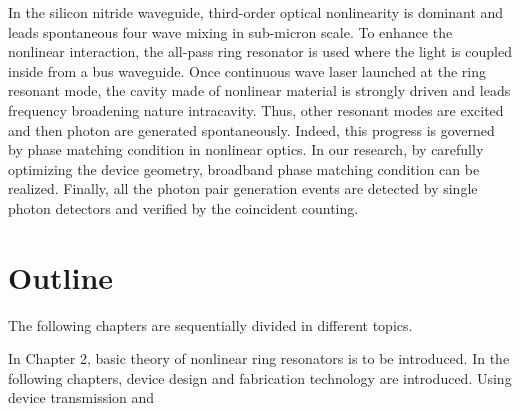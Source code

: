 In the silicon nitride waveguide, third-order optical nonlinearity is dominant and leads spontaneous four wave mixing in sub-micron scale. 
To enhance the nonlinear interaction, the all-pass ring resonator is used where the light is coupled inside from a bus waveguide. Once continuous wave laser launched at the ring resonant mode, the cavity made of nonlinear material is strongly driven and leads frequency broadening nature intracavity. Thus, other resonant modes are excited and then photon are generated spontaneously. Indeed, this progress is governed by phase matching condition in nonlinear optics.
In our research, by carefully optimizing the device geometry, broadband phase matching condition can be realized. 
Finally, all the photon pair generation events are detected by single photon detectors and verified by the coincident counting. 

\newpage

\section{Outline}

The following chapters are sequentially divided in different topics.

In Chapter 2, basic theory of nonlinear ring resonators is to be introduced. In the following chapters, device design and fabrication technology are introduced. Using device transmission and 
